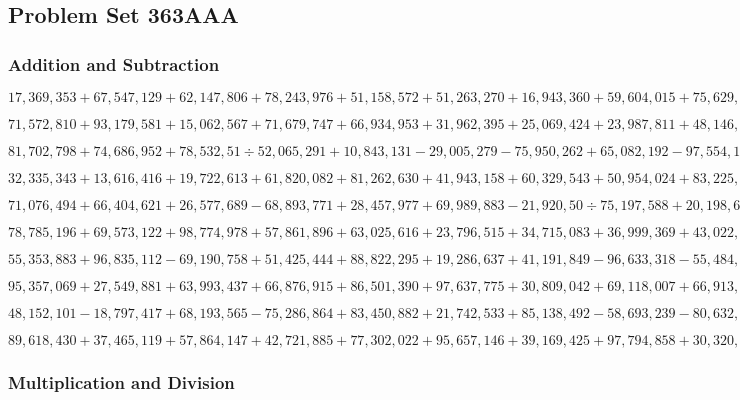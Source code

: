 \hypertarget{problem-set-363aaa}{%
\subsection{Problem Set 363AAA}\label{problem-set-363aaa}}

\hypertarget{addition-and-subtraction}{%
\subsubsection{Addition and
Subtraction}\label{addition-and-subtraction}}

\(17,369,353+67,547,129+62,147,806+78,243,976+51,158,572+51,263,270+16,943,360+59,604,015+75,629,265+17,986,748\)

\(71,572,810+93,179,581+15,062,567+71,679,747+66,934,953+31,962,395+25,069,424+23,987,811+48,146,265+12,857,583\)

\(81,702,798+74,686,952+78,532,51÷52,065,291+10,843,131-29,005,279-75,950,262+65,082,192-97,554,147+78,548,730\)

\(32,335,343+13,616,416+19,722,613+61,820,082+81,262,630+41,943,158+60,329,543+50,954,024+83,225,132+83,760,009\)

\(71,076,494+66,404,621+26,577,689-68,893,771+28,457,977+69,989,883-21,920,50÷75,197,588+20,198,666-26,854,715\)

\(78,785,196+69,573,122+98,774,978+57,861,896+63,025,616+23,796,515+34,715,083+36,999,369+43,022,911+58,476,885\)

\(55,353,883+96,835,112-69,190,758+51,425,444+88,822,295+19,286,637+41,191,849-96,633,318-55,484,415-17,112,703\)

\(95,357,069+27,549,881+63,993,437+66,876,915+86,501,390+97,637,775+30,809,042+69,118,007+66,913,076+15,165,291\)

\(48,152,101-18,797,417+68,193,565-75,286,864+83,450,882+21,742,533+85,138,492-58,693,239-80,632,263+10,256,029\)

\(89,618,430+37,465,119+57,864,147+42,721,885+77,302,022+95,657,146+39,169,425+97,794,858+30,320,352+42,009,806\)

\hypertarget{multiplication-and-division}{%
\subsubsection{Multiplication and
Division}\label{multiplication-and-division}}

